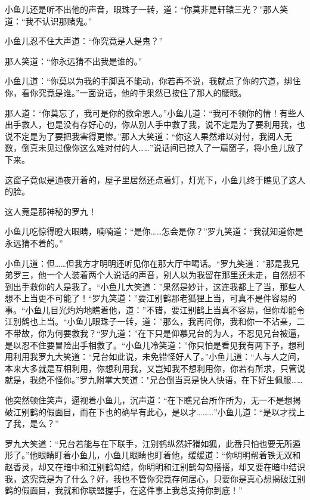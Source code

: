 \documentclass[12pt,oneside]{book}
\begin{document}
小鱼儿还是听不出他的声音，眼珠子一转，道：``你莫非是轩辕三光？''那人笑道：``我不认识那赌鬼。''

小鱼儿忍不住大声道：``你究竟是人是鬼？''

那人笑道：``你永远猜不出我是谁的。''

小鱼儿道：``你莫以为我的手脚真不能动，你若再不说，我就点了你的穴道，绑住你，看你究竟是谁。''一面说话，他的手果然已按住了那人的腰眼。

那人道：``你莫忘了，我可是你的救命恩人。''小鱼儿道：``我可不领你的情！有些人出手救人，也是没有存好心的，你从别人手中救了我，说不定是为了要利用我，也说不定是为了要把我害得更惨。''那人大笑道：``你这人果然难以对付，我阅人无数，倒真未见过像你这么难对付的人\ldots\ldots{}''说话间已掠入了一扇窗子，将小鱼儿放了下来。

这窗子竟似是通夜开着的，屋子里居然还点着灯，灯光下，小鱼儿终于瞧见了这人的脸。

这人竟是那神秘的罗九！

小鱼儿吃惊得瞪大眼睛，喃喃道：``是你\ldots\ldots 怎会是你？''罗九笑道：``我就知道你是永远猜不着的。''

小鱼儿道：但\ldots\ldots 但我方才明明还听见你在那大厅中喝话。``罗九笑道：''那是我兄弟罗三，他一个人装着两个人说话的声音，别人以为我留在那里还未走，自然想不到出手救你的人是我了。``小鱼儿大笑道：''果然是妙计，这连我都上了当，那些人想不上当更不可能了！``罗九笑道：''要江别鹤那老狐狸上当，可真不是件容易的事。``小鱼儿目光灼灼地瞧着他，道：''不错，要江别鹤上当真不容易，但你却能令江别鹤也上当。``小鱼儿眼珠子一转，道：''那么，我再问你，我和你一不沾亲，二不带故，你为何要救我？``罗九道：''在下只是仰慕兄台的为人，不忍见兄台被逼，是以忍不住要冒险出手相救了。``小鱼儿冷笑道：''你只怕是看见我有两下予，想利用利用我罗九大笑道：``兄台如此说，未免错怪好人了。''小鱼儿道：``人与人之间，本来大多就是互相利用，你想利用我，又岂知我不想利用你，你若有所求，只管说就是，我绝不怪你。''罗九附掌大笑道："兄台倒当真是快人快语，在下好生佩服\ldots\ldots{}

他突然顿住笑声，逼视着小鱼儿，沉声道：``在下瞧兄台所作所为，无一不是想揭破江别鹤的假面目，而在下也的确早有此心，是以才\ldots\ldots\ldots{}''小鱼儿道：``是以才找上了我，是么？''

罗九大笑道：``兄台若能与在下联手，江别鹤纵然奸猾如狐，此番只怕也要无所遁形了。''他眼睛盯着小鱼儿，小鱼儿眼睛也盯着他，缓缓道：``你明明帮着铁无双和赵香灵，却又在暗中和江别鹤勾结，你明明和江别鹤勾勾搭搭，却又要在暗中结识我，这究竟是为了什么？好，我也不管你究竟存何居心，只要你是真心想揭破江别鹤的假面目，我就和你联盟握手，在这件事上我总支持你到底！''
\end{document}
